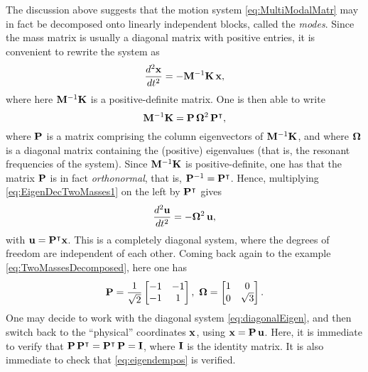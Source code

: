 \documentclass[11pt,twoside,a4paper,english]{book}
\begin{document}
The discussion above suggests that the motion system \eqref{eq:MultiModalMatr} may in fact be decomposed onto linearly independent blocks, called the \emph{modes}.  Since the mass matrix is usually a diagonal matrix with positive entries, it is convenient to rewrite the system as
\begin{equation}\label{eq:EigenDecTwoMasses1}
\frac{d^2{\bf x}}{dt^2} = -{ \bf M}^{-1}{\bf K} \, {\bf x}, 
\end{equation}
where here ${{\bf M}^{-1}\bf K}$ is a positive-definite matrix. One is then able to write
\begin{equation}\label{eq:eigendempos}
{\bf M}^{-1}{\bf K} = {\bf P} \, {\bf \Omega}^2 \, {\bf P}^{\intercal},
\end{equation}
where ${\bf P}$ is a matrix comprising the column eigenvectors of ${\bf M}^{-1}{\bf K}$, and where ${\bf \Omega}$ is a diagonal matrix containing the (positive) eigenvalues (that is, the resonant frequencies of the system). Since ${\bf M}^{-1}{\bf K}$ is positive-definite, one has that the matrix ${\bf P}$ is in fact \emph{orthonormal}, that is, ${\bf P}^{-1}={\bf P}^\intercal$. Hence, multiplying \eqref{eq:EigenDecTwoMasses1} on the left by ${\bf P}^\intercal$ gives
\begin{equation}\label{eq:diagonalEigen}
\frac{d^2{\bf u}}{dt^2} = -{\bf \Omega}^2 \, {\bf u}, 
\end{equation}
with ${\bf u} = {\bf P}^{\intercal}{\bf x}$. This is a completely diagonal system, where the  degrees of freedom are independent of each other. Coming back again to the example \eqref{eq:TwoMassesDecomposed}, here one has
\begin{equation}
{\bf P} =  \frac{1}{\sqrt{2}}\begin{bmatrix}-1 & -1 \\ -1 & 1 \end{bmatrix}, \,\, {\bf \Omega} =  \begin{bmatrix}1 & 0 \\ 0 & \sqrt{3} \end{bmatrix}.
\end{equation}
One may decide to work with the diagonal system \eqref{eq:diagonalEigen}, and then switch back to the ``physical'' coordinates $\bf x$, using ${\bf x} = {\bf P}\,{\bf u}$. Here, it is immediate to verify that ${\bf P} \, {\bf P}^{\intercal} = {\bf P}^\intercal \, {\bf P} = {\bf I}$, where ${\bf I}$ is the identity matrix. It is also immediate to check that \eqref{eq:eigendempos} is verified. 
\end{document}
